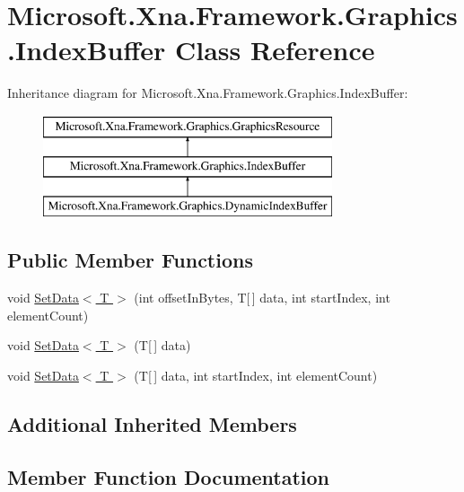\hypertarget{class_microsoft_1_1_xna_1_1_framework_1_1_graphics_1_1_index_buffer}{}\section{Microsoft.\+Xna.\+Framework.\+Graphics.\+Index\+Buffer Class Reference}
\label{class_microsoft_1_1_xna_1_1_framework_1_1_graphics_1_1_index_buffer}
Inheritance diagram for Microsoft.\+Xna.\+Framework.\+Graphics.\+Index\+Buffer\+:\begin{figure}[H]
\begin{center}
\leavevmode
\includegraphics[height=3.000000cm]{class_microsoft_1_1_xna_1_1_framework_1_1_graphics_1_1_index_buffer}
\end{center}
\end{figure}
\subsection*{Public Member Functions}
\begin{DoxyCompactItemize}
\item 
void \hyperlink{class_microsoft_1_1_xna_1_1_framework_1_1_graphics_1_1_index_buffer_a01b91d18fd8c6f1b78eae0c97472c38c}{Set\+Data$<$ T $>$} (int offset\+In\+Bytes, T\mbox{[}$\,$\mbox{]} data, int start\+Index, int element\+Count)
\item 
void \hyperlink{class_microsoft_1_1_xna_1_1_framework_1_1_graphics_1_1_index_buffer_ad455eb7dfca33512305b93f2f4d66c69}{Set\+Data$<$ T $>$} (T\mbox{[}$\,$\mbox{]} data)
\item 
void \hyperlink{class_microsoft_1_1_xna_1_1_framework_1_1_graphics_1_1_index_buffer_a6b29c0475064e55c5d883ecf8661aaa5}{Set\+Data$<$ T $>$} (T\mbox{[}$\,$\mbox{]} data, int start\+Index, int element\+Count)
\end{DoxyCompactItemize}
\subsection*{Additional Inherited Members}


\subsection{Member Function Documentation}
\hypertarget{class_microsoft_1_1_xna_1_1_framework_1_1_graphics_1_1_index_buffer_a01b91d18fd8c6f1b78eae0c97472c38c}{}

